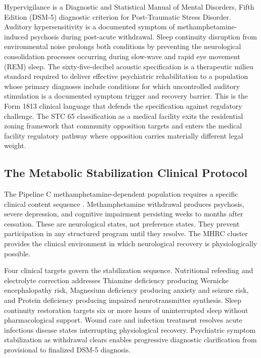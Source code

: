 \documentclass[12pt, letterpaper]{article}
\begin{document}
Hypervigilance is a Diagnostic and Statistical Manual of Mental Disorders, Fifth Edition (DSM-5) diagnostic criterion for Post-Traumatic Stress Disorder. Auditory hypersensitivity is a documented symptom of methamphetamine-induced psychosis during post-acute withdrawal. Sleep continuity disruption from environmental noise prolongs both conditions by preventing the neurological consolidation processes occurring during slow-wave and rapid eye movement (REM) sleep. The sixty-five-decibel acoustic specification is a therapeutic milieu standard required to deliver effective psychiatric rehabilitation to a population whose primary diagnoses include conditions for which uncontrolled auditory stimulation is a documented symptom trigger and recovery barrier. This is the Form 1813 clinical language that defends the specification against regulatory challenge. The STC 65 classification as a medical facility exits the residential zoning framework that community opposition targets and enters the medical facility regulatory pathway where opposition carries materially different legal weight.

\subsection{The Metabolic Stabilization Clinical Protocol}

The Pipeline C methamphetamine-dependent population requires a specific clinical content sequence \citep{refeeding_syndrome_2008}. Methamphetamine withdrawal produces psychosis, severe depression, and cognitive impairment persisting weeks to months after cessation. These are neurological states, not preference states. They prevent participation in any structured program until they resolve. The MHRC cluster provides the clinical environment in which neurological recovery is physiologically possible.

Four clinical targets govern the stabilization sequence. Nutritional refeeding and electrolyte correction addresses Thiamine deficiency producing Wernicke encephalopathy risk, Magnesium deficiency producing anxiety and seizure risk, and Protein deficiency producing impaired neurotransmitter synthesis. Sleep continuity restoration targets six or more hours of uninterrupted sleep without pharmacological support. Wound care and infection treatment resolves acute infectious disease states interrupting physiological recovery. Psychiatric symptom stabilization as withdrawal clears enables progressive diagnostic clarification from provisional to finalized DSM-5 diagnosis.
\end{document}
